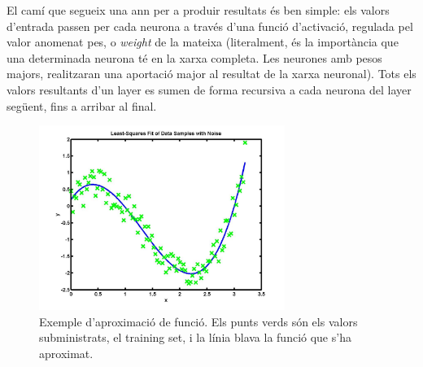 El camí que segueix una \ac{ann} per a produir resultats és ben simple: els valors d'entrada passen per cada neurona a través d'una funció d'activació, regulada
pel valor anomenat pes, o \emph{weight} de la mateixa (literalment, és la importància que una determinada neurona
té en la xarxa completa. Les neurones amb pesos majors, realitzaran una aportació major al resultat de la xarxa neuronal). Tots els valors resultants d'un
layer es sumen de forma recursiva a cada neurona del layer següent, fins a arribar al final.

\begin{figure}[ht!]
\centering
\includegraphics[width=80mm]{data/func_approx.jpg}
\caption{Exemple d'aproximació de funció. Els punts verds són els valors subministrats, el training set,
i la línia blava la funció que s'ha aproximat.}
\label{func_approx}
\end{figure}
